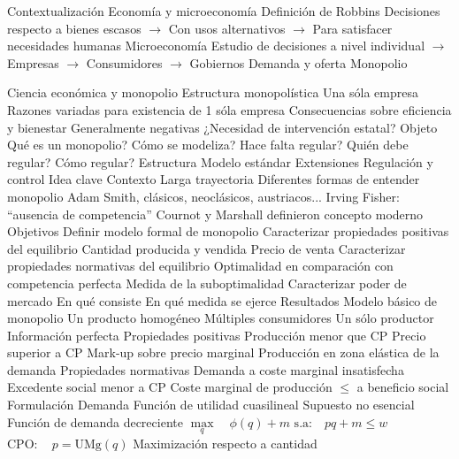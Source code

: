 \documentclass{nuevotema}
\begin{document}
\begin{esquemal}
	\1[] 
		\2 Contextualización
			\3 Economía y microeconomía
				\4 Definición de Robbins
				\4[] Decisiones respecto a bienes escasos
				\4[] $\to$ Con usos alternativos
				\4[] $\to$ Para satisfacer necesidades humanas
				\4 Microeconomía
				\4[] Estudio de decisiones a nivel individual
				\4[] $\to$ Empresas
				\4[] $\to$ Consumidores
				\4[] $\to$ Gobiernos
			\3 Demanda y oferta
			\3 Monopolio

			\3 Ciencia económica y monopolio
			\3 Estructura monopolística
				\4 Una sóla empresa
				\4[] Razones variadas para existencia de 1 sóla empresa
				\4 Consecuencias sobre eficiencia y bienestar
				\4[] Generalmente negativas
				\4 ¿Necesidad de intervención estatal?
		\2 Objeto
			\3 Qué es un monopolio?
			\3 Cómo se modeliza?
			\3 Hace falta regular?
			\3 Quién debe regular?
			\3 Cómo regular?
		\2 Estructura
			\3 Modelo estándar
			\3 Extensiones
			\3 Regulación y control
	\1 
		\2 Idea clave
			\3 Contexto
				\4 Larga trayectoria
				\4 Diferentes formas de entender monopolio
				\4 Adam Smith, clásicos, neoclásicos, austriacos...
				\4 Irving Fisher:
				\4[] ``ausencia de competencia''
				\4 Cournot y Marshall definieron concepto moderno
			\3 Objetivos
				\4 Definir modelo formal de monopolio
				\4 Caracterizar propiedades positivas del equilibrio
				\4[] Cantidad producida y vendida
				\4[] Precio de venta
				\4 Caracterizar propiedades normativas del equilibrio
				\4[] Optimalidad en comparación con competencia perfecta
				\4[] Medida de la suboptimalidad
				\4 Caracterizar poder de mercado
				\4[] En qué consiste
				\4[] En qué medida se ejerce
			\3 Resultados
				\4 Modelo básico de monopolio
				\4[] Un producto homogéneo
				\4[] Múltiples consumidores
				\4[] Un sólo productor
				\4[] Información perfecta
				\4 Propiedades positivas
				\4[] Producción menor que CP
				\4[] Precio superior a CP
				\4[] Mark-up sobre precio marginal
				\4[] Producción en zona elástica de la demanda
				\4 Propiedades normativas
				\4[] Demanda a coste marginal insatisfecha
				\4[] Excedente social menor a CP
				\4[] Coste marginal de producción $\leq$ a beneficio social
		\2 Formulación
			\3 Demanda
				\4[(i)] Función de utilidad cuasilineal
				\4[] Supuesto no esencial
				\4[(ii)] Función de demanda decreciente
				\4[] $\underset{q}{\max} \quad \phi(q) + m$
				\4[] $\text{s.a:} \quad pq + m \leq w$
				\4[] $\text{CPO}: \quad p = \text{UMg}(q)$
			\3 Maximización respecto a cantidad

\end{esquemal}
\end{document}
